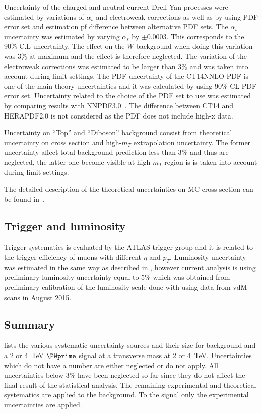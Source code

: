 Uncertainty of the charged and neutral current Drell-Yan processes were estimated by variations of $\alpha_s$ and electroweak corrections as well as by using PDF error set and estimation pf difference between alternative PDF sets.
The $\alpha_s$ uncertainty was estimated by varying $\alpha_s$ by $\pm 0.0003$. This corresponds to the 90\% C.L uncertainty. The effect on the $W$ background when doing this variation
was $3\%$ at maximum and the effect is therefore neglected. 
The variation of the electroweak corrections was estimated to be larger than $3\%$ and was
taken into account during limit settings.
The PDF uncertainty of the CT14NNLO PDF is one of the main theory uncertainties
and it was calculated by using 90$\%$ CL PDF error set.
Uncertainty related to the choice of the PDF set to use was estimated by comparing
results with NNPDF3.0~\cite{Ball:2014uwa}.
The difference between CT14 and HERAPDF2.0 is not considered as the PDF does not include high-x data. 

Uncertainty on ``Top'' and ``Diboson'' background consist from theoretical uncertainty on cross section and high-$m_T$ extrapolation uncertainty. The former uncertainty affect total background
prediction less than 3$\%$ and thus are neglected, the latter one become visible at high-$m_T$
region is is taken into account during limit settings.

The detailed description of the theoretical uncertainties on MC cross section can be found in~\cite{Aaboud:2016zkn}.

\subsection{Trigger and luminosity}
Trigger systematics is evaluated by the ATLAS trigger group and it is related to the trigger
efficiency of muons with different $\eta$ and $p_T$.
Luminosity uncertainty was estimated in the same way as described in , however current analysis is using preliminary luminosity
uncertainty equal to 5$\%$ which was obtained from preliminary calibration of the luminosity scale done with using data from vdM scans in August 2015.

\subsection{Summary}
 lists the various systematic uncertainty sources
and their size for background and a 2 or 4~TeV $\PWprime$ signal at a transverse mass at 2 or 4~TeV.
Uncertainties which do not have a number are either neglected or do not apply. 
All uncertainties below $3$\% have been neglected so far
since they do not affect the final result of the statistical analysis. 
The remaining experimental and theoretical systematics are applied to the background.
To the signal only the experimental uncertainties are applied. 

